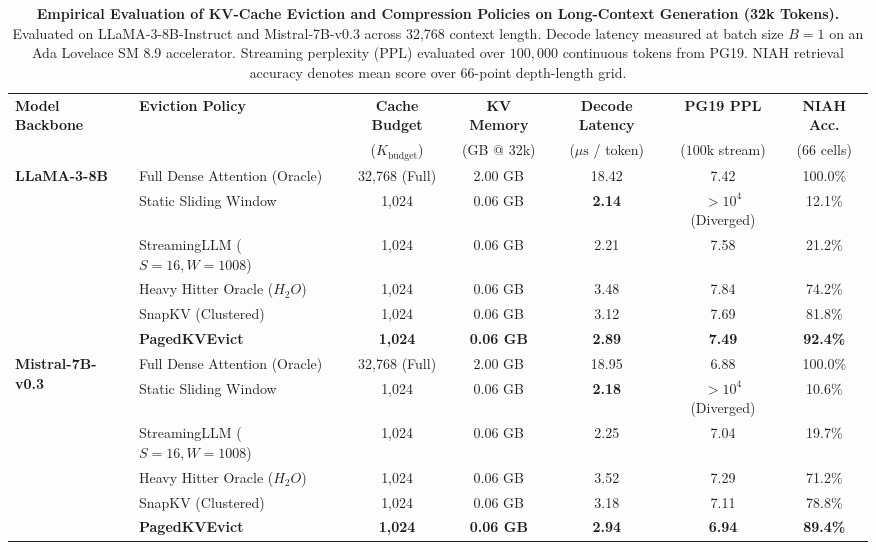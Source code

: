 \begin{table}[t]
\centering
\small
\caption[Evaluation of KV-Cache Eviction Policies]{\textbf{Empirical Evaluation of KV-Cache Eviction and Compression Policies on Long-Context Generation (32k Tokens).} Evaluated on LLaMA-3-8B-Instruct and Mistral-7B-v0.3 across 32,768 context length. Decode latency measured at batch size $B=1$ on an Ada Lovelace SM 8.9 accelerator. Streaming perplexity ($\text{PPL}$) evaluated over $100{,}000$ continuous tokens from PG19. NIAH retrieval accuracy denotes mean score over 66-point depth-length grid.}
\label{tab:serving_kv_cache_eviction_benchmarks}
\setlength{\tabcolsep}{5pt}
\renewcommand{\arraystretch}{1.15}
\begin{tabular}{llccccc}
\toprule
\textbf{Model Backbone} & \textbf{Eviction Policy} & \textbf{Cache Budget} & \textbf{KV Memory} & \textbf{Decode Latency} & \textbf{PG19 PPL} & \textbf{NIAH Acc.} \\
 & & ($K_{\text{budget}}$) & (GB @ 32k) & ($\mu\text{s}$ / token) & ($100\text{k}$ stream) & (66 cells) \\
\midrule
\multirow{6}{*}{\textbf{LLaMA-3-8B}} 
 & Full Dense Attention (Oracle) & 32,768 (Full) & 2.00 GB & 18.42 & 7.42 & 100.0\% \\
 & Static Sliding Window         & 1,024         & 0.06 GB & \textbf{2.14} & $>10^4$ (Diverged) & 12.1\% \\
 & StreamingLLM ($S{=}16, W{=}1008$) & 1,024     & 0.06 GB & 2.21 & 7.58 & 21.2\% \\
 & Heavy Hitter Oracle ($H_2O$)  & 1,024         & 0.06 GB & 3.48 & 7.84 & 74.2\% \\
 & SnapKV (Clustered)            & 1,024         & 0.06 GB & 3.12 & 7.69 & 81.8\% \\
 & \textbf{\neuralops{} PagedKVEvict} & \textbf{1,024} & \textbf{0.06 GB} & \textbf{2.89} & \textbf{7.49} & \textbf{92.4\%} \\
\midrule
\multirow{6}{*}{\textbf{Mistral-7B-v0.3}}
 & Full Dense Attention (Oracle) & 32,768 (Full) & 2.00 GB & 18.95 & 6.88 & 100.0\% \\
 & Static Sliding Window         & 1,024         & 0.06 GB & \textbf{2.18} & $>10^4$ (Diverged) & 10.6\% \\
 & StreamingLLM ($S{=}16, W{=}1008$) & 1,024     & 0.06 GB & 2.25 & 7.04 & 19.7\% \\
 & Heavy Hitter Oracle ($H_2O$)  & 1,024         & 0.06 GB & 3.52 & 7.29 & 71.2\% \\
 & SnapKV (Clustered)            & 1,024         & 0.06 GB & 3.18 & 7.11 & 78.8\% \\
 & \textbf{\neuralops{} PagedKVEvict} & \textbf{1,024} & \textbf{0.06 GB} & \textbf{2.94} & \textbf{6.94} & \textbf{89.4\%} \\
\bottomrule
\end{tabular}
\end{table}

